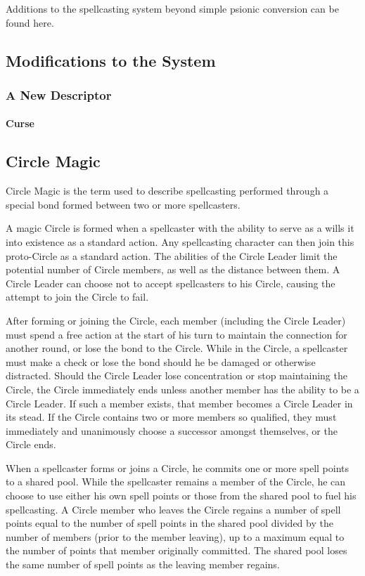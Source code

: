Additions to the spellcasting system beyond simple psionic conversion can be found here.
\subsection{Modifications to the System}

\subsubsection{A New Descriptor}
\paragraph[Curse]{Curse} 
\subsection{Circle Magic}
\label{sec:CircleMagic}
Circle Magic is the term used to describe spellcasting performed through a special bond formed between two or more spellcasters.

A magic Circle is formed when a spellcaster with the ability to serve as a  wills it into existence as a standard action. Any spellcasting character can then join this proto-Circle as a standard action. The abilities of the Circle Leader limit the potential number of Circle members, as well as the distance between them. A Circle Leader can choose not to accept spellcasters to his Circle, causing the attempt to join the Circle to fail.

After forming or joining the Circle, each member (including the Circle Leader) must spend a free action at the start of his turn to maintain the connection for another round, or lose the bond to the Circle. While in the Circle, a spellcaster must make a  check or lose the bond should he be damaged or otherwise distracted.
Should the Circle Leader lose concentration or stop maintaining the Circle, the Circle immediately ends unless another member has the ability to be a Circle Leader. If such a member exists, that member becomes a Circle Leader in its stead. If the Circle contains two or more members so qualified, they must immediately and unanimously choose a successor amongst themselves, or the Circle ends.

When a spellcaster forms or joins a Circle, he commits one or more spell points to a shared pool. While the spellcaster remains a member of the Circle, he can choose to use either his own spell points or those from the shared pool to fuel his spellcasting.
A Circle member who leaves the Circle regains a number of spell points equal to the number of spell points in the shared pool divided by the number of members (prior to the member leaving), up to a maximum equal to the number of points that member originally committed. The shared pool loses the same number of spell points as the leaving member regains.

